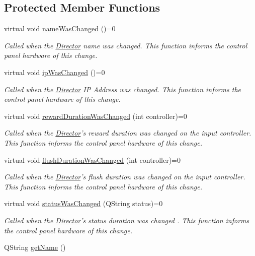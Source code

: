 \subsection*{Protected Member Functions}
\begin{DoxyCompactItemize}
\item 
virtual void \hyperlink{class_control_panel_interface_a1ff4cd53f53e2b46ace9db8d15af29e8}{name\-Was\-Changed} ()=0
\begin{DoxyCompactList}\small\item\em Called when the \hyperlink{class_director}{Director} name was changed. This function informs the control panel hardware of this change. \end{DoxyCompactList}\item 
virtual void \hyperlink{class_control_panel_interface_a1a7c6571f407622786488f1895fac6ef}{ip\-Was\-Changed} ()=0
\begin{DoxyCompactList}\small\item\em Called when the \hyperlink{class_director}{Director} I\-P Address was changed. This function informs the control panel hardware of this change. \end{DoxyCompactList}\item 
virtual void \hyperlink{class_control_panel_interface_a559dc32a89a9e6824e72f316017f62d1}{reward\-Duration\-Was\-Changed} (int controller)=0
\begin{DoxyCompactList}\small\item\em Called when the \hyperlink{class_director}{Director}'s reward duration was changed on the input controller. This function informs the control panel hardware of this change. \end{DoxyCompactList}\item 
virtual void \hyperlink{class_control_panel_interface_a749cdbf08aa200de81bca97e8a5f49ce}{flush\-Duration\-Was\-Changed} (int controller)=0
\begin{DoxyCompactList}\small\item\em Called when the \hyperlink{class_director}{Director}'s flush duration was changed on the input controller. This function informs the control panel hardware of this change. \end{DoxyCompactList}\item 
virtual void \hyperlink{class_control_panel_interface_a77f71357afc1feb5013ebec7a4e01ee3}{status\-Was\-Changed} (Q\-String status)=0
\begin{DoxyCompactList}\small\item\em Called when the \hyperlink{class_director}{Director}'s status duration was changed . This function informs the control panel hardware of this change. \end{DoxyCompactList}\item 
\hypertarget{class_control_panel_interface_a99738c601aeb18b587d5e6db64dc392c}{Q\-String \hyperlink{class_control_panel_interface_a99738c601aeb18b587d5e6db64dc392c}{get\-Name} ()}\label{class_control_panel_interface_a99738c601aeb18b587d5e6db64dc392c}


\end{DoxyCompactItemize}
